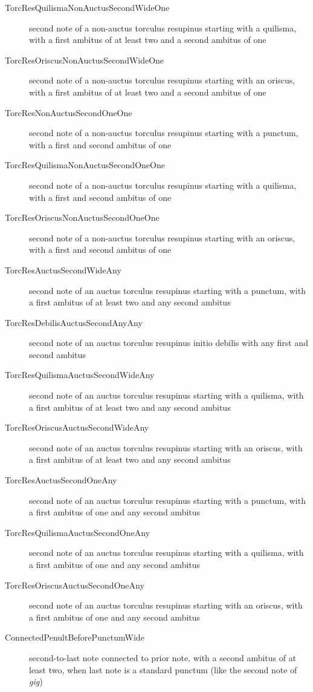 \begin{shaded*}
\begin{description}
  \item[TorcResQuilismaNonAuctusSecondWideOne] second note of a non-auctus torculus resupinus starting with a quilisma, with a first ambitus of at least two and a second ambitus of one
  \item[TorcResOriscusNonAuctusSecondWideOne] second note of a non-auctus torculus resupinus starting with an oriscus, with a first ambitus of at least two and a second ambitus of one
  \item[TorcResNonAuctusSecondOneOne] second note of a non-auctus torculus resupinus starting with a punctum, with a first and second ambitus of one
  \item[TorcResQuilismaNonAuctusSecondOneOne] second note of a non-auctus torculus resupinus starting with a quilisma, with a first and second ambitus of one
  \item[TorcResOriscusNonAuctusSecondOneOne] second note of a non-auctus torculus resupinus starting with an oriscus, with a first and second ambitus of one
  \item[TorcResAuctusSecondWideAny] second note of an auctus torculus resupinus starting with a punctum, with a first ambitus of at least two and any second ambitus
  \item[TorcResDebilisAuctusSecondAnyAny] second note of an auctus torculus resupinus initio debilis with any first and second ambitus
  \item[TorcResQuilismaAuctusSecondWideAny] second note of an auctus torculus resupinus starting with a quilisma, with a first ambitus of at least two and any second ambitus
  \item[TorcResOriscusAuctusSecondWideAny] second note of an auctus torculus resupinus starting with an oriscus, with a first ambitus of at least two and any second ambitus
  \item[TorcResAuctusSecondOneAny] second note of an auctus torculus resupinus starting with a punctum, with a first ambitus of one and any second ambitus
  \item[TorcResQuilismaAuctusSecondOneAny] second note of an auctus torculus resupinus starting with a quilisma, with a first ambitus of one and any second ambitus
  \item[TorcResOriscusAuctusSecondOneAny] second note of an auctus torculus resupinus starting with an oriscus, with a first ambitus of one and any second ambitus
  \item[ConnectedPenultBeforePunctumWide] second-to-last note connected to prior note, with a second ambitus of at least two, when last note is a standard punctum (like the second note of \textit{gig})

\end{description}
\end{shaded*}

